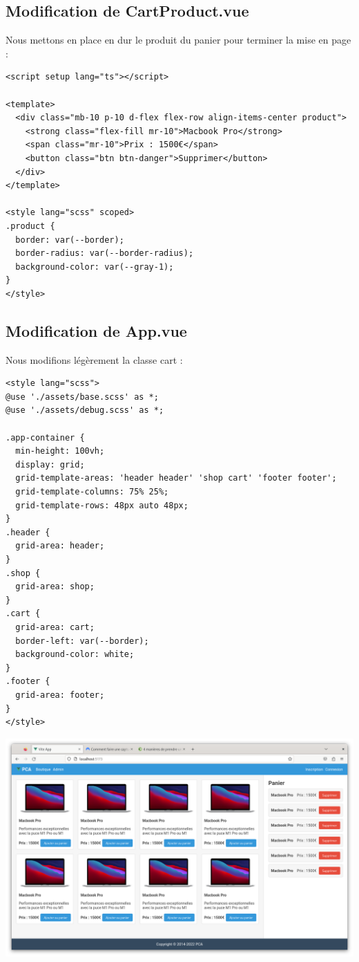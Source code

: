 \subsection{Modification de {\color{monOrange}CartProduct.vue}}
Nous mettons en place en dur le produit du panier pour terminer la mise en page :
\begin{verbatim}
<script setup lang="ts"></script>

<template>
  <div class="mb-10 p-10 d-flex flex-row align-items-center product">
    <strong class="flex-fill mr-10">Macbook Pro</strong>
    <span class="mr-10">Prix : 1500€</span>
    <button class="btn btn-danger">Supprimer</button>
  </div>
</template>

<style lang="scss" scoped>
.product {
  border: var(--border);
  border-radius: var(--border-radius);
  background-color: var(--gray-1);
}
</style>
\end{verbatim}

\subsection{Modification de {\color{monOrange}App.vue}}
Nous modifions légèrement la classe {\color{monOrange}cart} :
\begin{verbatim}
<style lang="scss">
@use './assets/base.scss' as *;
@use './assets/debug.scss' as *;

.app-container {
  min-height: 100vh;
  display: grid;
  grid-template-areas: 'header header' 'shop cart' 'footer footer';
  grid-template-columns: 75% 25%;
  grid-template-rows: 48px auto 48px;
}
.header {
  grid-area: header;
}
.shop {
  grid-area: shop;
}
.cart {
  grid-area: cart;
  border-left: var(--border);
  background-color: white;
}
.footer {
  grid-area: footer;
}
</style> 
\end{verbatim}

\begin{center}
\includegraphics[width=15cm]{images/image19.png}
\end{center}
